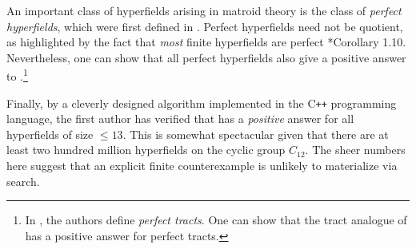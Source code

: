 \documentclass[reqno]{amsart}
\theoremstyle{definition}
\theoremstyle{remark}
\begin{document}
An important class of hyperfields arising in matroid theory is the class of \emph{perfect hyperfields}, which were first defined in \cite{baker17}. Perfect hyperfields need not be quotient, as highlighted by the fact that \emph{most} finite hyperfields are perfect {\cite{le26}*{Corollary 1.10}}. Nevertheless, one can show that all perfect hyperfields also give a positive answer to .\footnote{In \cite{bb19}, the authors define \emph{perfect tracts}. One can show that the tract analogue of  has a positive answer for perfect tracts.}

Finally, by a cleverly designed algorithm implemented in the C\texttt{++} programming language, the first author has verified that  has a \emph{positive} answer for all hyperfields of size $\leq 13$. This is somewhat spectacular given that there are at least two hundred million hyperfields on the cyclic group $C_{12}$. The sheer numbers here suggest that an explicit finite counterexample is unlikely to materialize via search.
\end{document}
